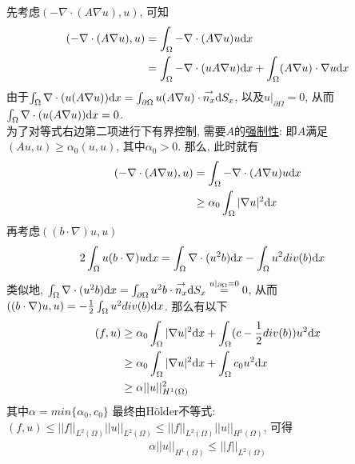 \documentclass[12pt]{article}
\begin{document}
\noindent 先考虑$(-\nabla\cdot (A\nabla u),u)$, 可知
\begin{align*}
	(-\nabla\cdot (A\nabla u),u)&=\int_{\Omega}^{}-\nabla\cdot (A\nabla u)u{\rm d}x\\
	&=\int_{\Omega}^{}-\nabla\cdot (uA\nabla u){\rm d}x+\int_{\Omega}^{}(A\nabla u)\cdot\nabla u{\rm d}x
\end{align*}
\noindent 由于$\int_{\Omega}^{}\nabla\cdot (u(A\nabla u)){\rm d}x=\int_{\partial \Omega}^{}u(A\nabla u)\cdot\overset{\rightarrow}{n_x}{\rm d}S_x$, 以及$u\vert _{\partial \Omega}=0$, 从而$\int_{\Omega}^{}\nabla\cdot (u(A\nabla u)){\rm d}x=0$.\\
为了对等式右边第二项进行下有界控制, 需要$A$的\underline{强制性}: 即$A$满足$(Au,u)\geq \alpha_0(u,u)$, 其中$\alpha_0 >0$. 那么, 此时就有
\begin{align*}
	(-\nabla\cdot (A\nabla u),u)&=\int_{\Omega}^{}-\nabla\cdot (A\nabla u)u{\rm d}x  \\
	&\ge \alpha_0 \int_{\Omega}^{}\vert \nabla u\vert ^2 {\rm d}x
\end{align*}
\noindent 再考虑$((b\cdot\nabla)u,u)$
\begin{align*}
	2\int_{\Omega}^{}u(b\cdot\nabla)u{\rm d}x&=\int_{\Omega}^{}\nabla \cdot (u^2b){\rm d}x-\int_{\Omega}^{}u^2div(b){\rm d}x
\end{align*}
\noindent 类似地, $\int_{\Omega}^{}\nabla \cdot (u^2b){\rm d}x=\int_{\partial \Omega}^{} u^2b\cdot\overset{\rightarrow}{n_x}{\rm d}S_x\overset{u\vert _{\partial \Omega}=0}{=}0$, 从而$((b\cdot\nabla)u,u)=-\frac{1}{2}\int_{\Omega}^{}u^2div(b){\rm d}x$. 那么有以下
\begin{align*}
	(f,u)&\ge\alpha_0 \int_{\Omega}^{}\vert \nabla u\vert ^2 {\rm d}x+\int_{\Omega}^{}(c-\frac{1}{2}div(b))u^2{\rm d}x\\
	&\ge\alpha_0 \int_{\Omega}^{}\vert \nabla u\vert ^2 {\rm d}x+\int_{\Omega}^{}c_0u^2{\rm d}x\\
	&\ge \alpha \vert \vert u \vert \vert^2_{H^1(\Omega)}
\end{align*}
\noindent 其中$\alpha = min\{\alpha_0,c_0\}$
\noindent 最终由Hölder不等式: $(f,u)\le \vert \vert f \vert \vert_{L^2(\Omega)}\vert \vert u\vert \vert_{L^2(\Omega)}\le\vert \vert f \vert \vert_{L^2(\Omega)}\vert \vert u\vert \vert_{H^1(\Omega)}$, 可得
\begin{align*}
	\alpha \vert \vert u\vert \vert_{H^1(\Omega)}\le\vert \vert f \vert \vert_{L^2(\Omega)}
\end{align*}
\quad \\
\end{document}
